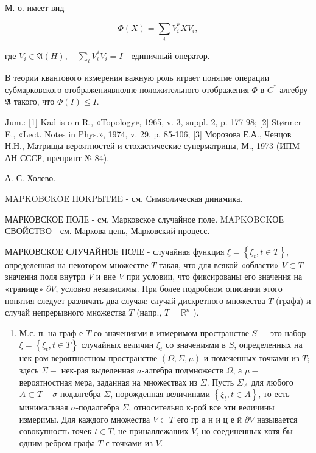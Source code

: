 \documentclass[10pt]{article}
\begin{document}
М. о. имеет вид



\[

\Phi(X)=\sum_{i} V_{i}^{*} X V_{i},

\]



где $V_{i} \in \mathfrak{A}(H), \quad \sum_{i} V_{i}^{*} V_{i}=I$ - единичный оператор.



В теории квантового измерения важную роль играет понятие операции субмарковского отображениявполне положительного отображения $\Phi$ в $C^{*}$-алгебру $\mathfrak{A}$ такого, что $\Phi(I) \leqslant I$.



Jum.: [1] Kad is o n R., «Topology», 1965, v. 3, suppl. 2, p. 177-98; [2] Størmer E., «Lect. Notes in Phys.», 1974, v. 29, p. 85-106; [3] Морозова Е.А., Ченцов Н.Н., Матрищы вероятностей и стохастические суперматрицы, М., 1973 (ИПМ АН СССР, препринт № 84).



А. С. Холево.



MAPKOBCKOE ПOKPЫTИE - см. Символическая динамика.



МАРКОВСКОЕ ПОЛЕ - см. Марковское случайное поле. MAPKOBCKОЕ СВОЙСТBО - см. Маркова цепь, Марковский процесс.



МАРКОВСКОЕ СЛУЧАЙНОЕ ПОЛЕ - случайная функция $\xi=\left\{\xi_{t}, t \in T\right\}$, определенная на некотором множестве $T$ такая, что для всякой «области» $V \subset T$ значения поля внутри $V$ и вне $V$ при условии, что фиксированы его значения на «границе» $\partial V$, условно независимы. При более подробном описании этого понятия следует различать два случая: случай дискретного множества $T$ (графа) и случай непрерывного множества $T$ (напр., $T=\mathbb{R}^{n}$ ).



\begin{enumerate}

  \item М.с. п. на граф е $T$ со значениями в измеримом пространстве $S-$ это набор $\xi=\left\{\xi_{t}, t \in T\right\}$ случайных величин $\xi_{t}$ со значениями в $S$, определенных на нек-ром вероятностном пространстве $(\Omega, \Sigma, \mu)$ и помеченных точками из $T$; здесь $\Sigma-$ нек-рая выделенная $\sigma$-алгебра подмножеств $\Omega$, а $\mu-$ вероятностная мера, заданная на множествах из $\Sigma$. Пусть $\Sigma_{A}$ для любого $A \subset T-\sigma$-подалгебра $\Sigma$, порожденная величинами $\left\{\xi_{t}, t \in A\right\}$, то есть минимальная $\sigma$-подалгебра $\Sigma$, относительно к-рой все эти величины измеримы. Для каждого множества $V \subset T$ его гр а н и ц е й $\partial V$ называется совокупность точек $t \in T$, не приналлежаших $V$, но соединенных хотя бы одним ребром графа $T$ с точками из $V$.

\end{enumerate}
\end{document}

